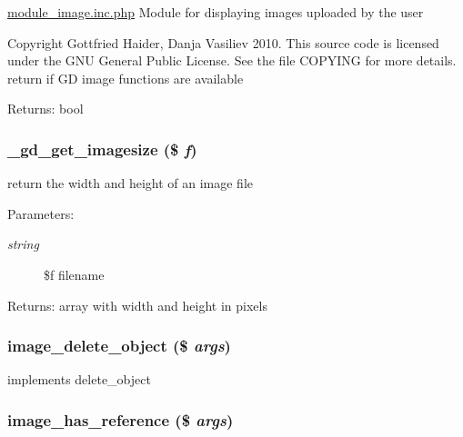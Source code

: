 \hyperlink{module__image_8inc_8php}{module\_\-image.inc.php} Module for displaying images uploaded by the user

Copyright Gottfried Haider, Danja Vasiliev 2010. This source code is licensed under the GNU General Public License. See the file COPYING for more details. return if GD image functions are available

\begin{Desc}
\item[Returns:]bool \end{Desc}
\hypertarget{module__image_8inc_8php_3c76028c34273e722c9691243377a208}{
\subsubsection[{\_\-gd\_\-get\_\-imagesize}]{\setlength{\rightskip}{0pt plus 5cm}\_\-gd\_\-get\_\-imagesize (\$ {\em f})}}
\label{module__image_8inc_8php_3c76028c34273e722c9691243377a208}


return the width and height of an image file

\begin{Desc}
\item[Parameters:]
\begin{description}
\item[{\em string}]\$f filename\end{description}
\end{Desc}
\begin{Desc}
\item[Returns:]array with width and height in pixels \end{Desc}
\hypertarget{module__image_8inc_8php_7cbcf6138ccff16a8b733cfd6f0f1666}{
\subsubsection[{image\_\-delete\_\-object}]{\setlength{\rightskip}{0pt plus 5cm}image\_\-delete\_\-object (\$ {\em args})}}
\label{module__image_8inc_8php_7cbcf6138ccff16a8b733cfd6f0f1666}


implements delete\_\-object \hypertarget{module__image_8inc_8php_0bef6164f5eafe368d251639cf6fe298}{
\subsubsection[{image\_\-has\_\-reference}]{\setlength{\rightskip}{0pt plus 5cm}image\_\-has\_\-reference (\$ {\em args})}}
\label{module__image_8inc_8php_0bef6164f5eafe368d251639cf6fe298}


